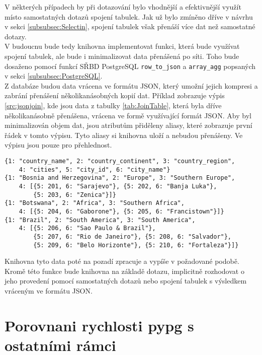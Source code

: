 \documentclass[ing,male,java,dept456]{diploma}						%
\begin{document}
V některých případech by při dotazování bylo vhodnější a efektivnější využít místo samostatných dotazů spojení tabulek. Jak už bylo zmíněno dříve v návrhu v sekci \ref{subsubsec:Selectin}, spojení tabulek však přenáší více dat než samostatné dotazy. \\ 
V budoucnu bude tedy knihovna implementovat funkci, která bude využívat spojení tabulek, ale bude i minimalizovat data přenášená po síti. Toho bude dosaženo pomocí funkcí SŘBD PostgreSQL \lstinline[style=inlinepython]|row_to_json| a \lstinline[style=inlinepython]|array_agg| popsaných v sekci \ref{subsubsec:PostgreSQL}. \\
Z databáze budou data vrácena ve formátu JSON, který umožní jejich kompresi a zabrání přenášení několikanásobných kopií dat. Příklad zobrazuje výpis \ref{src:jsonjoin}, kde jsou data z tabulky \ref{tab:JoinTable}, která byla dříve několikanásobně přenášena, vrácena ve formě využívající formát JSON. Aby byl minimalizován objem dat, jsou atributům přiděleny aliasy, které zobrazuje první řádek v tomto výpisu. Tyto aliasy si knihovna uloží a nebudou přenášeny. Ve výpisu jsou pouze pro přehlednost. \\
\begin{lstlisting}[style=custompython, label=src:jsonjoin, caption={Minimalizace přenášených dat z tabulky \ref{tab:JoinTable} pomocí formátu JSON}]
{1: "country_name", 2: "country_continent", 3: "country_region", 
	4: "cities", 5: "city_id", 6: "city_name"}
{1: "Bosnia and Herzegovina", 2: "Europe", 3: "Southern Europe", 
	4: [{5: 201, 6: "Sarajevo"}, {5: 202, 6: "Banja Luka"}, 
		{5: 203, 6: "Zenica"}]}
{1: "Botswana", 2: "Africa", 3: "Southern Africa", 
	4: [{5: 204, 6: "Gaborone"}, {5: 205, 6: "Francistown"}]}
{1: "Brazil", 2: "South America", 3: "South America", 
	4: [{5: 206, 6: "Sao Paulo & Brazil"}, 
		{5: 207, 6: "Rio de Janeiro"}, {5: 208, 6: "Salvador"}, 
		{5: 209, 6: "Belo Horizonte"}, {5: 210, 6: "Fortaleza"}]}
\end{lstlisting}

Knihovna tyto data poté na pozadí zpracuje a vypíše v požadované podobě. \\
Kromě této funkce bude knihovna na základě dotazu, implicitně rozhodovat o jeho provedení pomocí samostatných dotazů nebo spojení tabulek s výsledkem vráceným ve formátu JSON.

\section{Porovnani rychlosti pypg s ostatními rámci}
\end{document}
